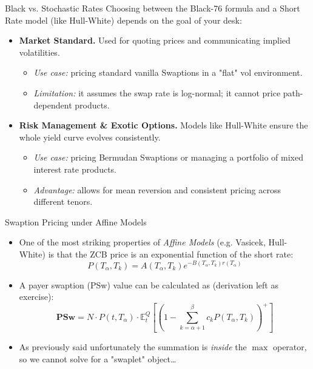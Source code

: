 \documentclass{beamer}
\begin{document}
\begin{frame}{Black vs. Stochastic Rates}
	Choosing between the Black-76 formula and a Short Rate model (like Hull-White) depends on the goal of your desk:
	\vfill
	\begin{itemize}
		\item \textbf{Market Standard.} Used for quoting prices and communicating implied volatilities.
		\begin{itemize}
			\item \emph{Use case:} pricing standard vanilla Swaptions in a "flat" vol environment.
			\item \emph{Limitation:} it assumes the swap rate is log-normal; it cannot price path-dependent products.
		\end{itemize}
		\vfill
		\item \textbf{Risk Management \& Exotic Options.} Models like Hull-White ensure the whole yield curve evolves consistently.
		\begin{itemize}
			\item \emph{Use case:} pricing Bermudan Swaptions or managing a portfolio of mixed interest rate products.
			\item \emph{Advantage:} allows for mean reversion and consistent pricing across different tenors.
		\end{itemize}
	\end{itemize}
\end{frame}

\begin{frame}{Swaption Pricing under Affine Models}
	\begin{itemize}
		\item One of the most striking properties of \emph{Affine Models} (e.g. Vasicek, Hull-White) is that the ZCB price is an exponential function of the short rate:
		\begin{equation*}
			P(T_\alpha, T_k) = A(T_\alpha, T_k) e^{-B(T_\alpha, T_k) r(T_\alpha)}
		\end{equation*}
		\item A payer swaption (PSw) value can be calculated as (derivation left as exercise):
		\begin{equation}
			\textbf{PSw} = N\cdot P(t, T_\alpha)\cdot \mathbb{E}^{Q}_t \left[ \left( 1 - \sum_{k=\alpha+1}^\beta c_k P(T_\alpha, T_k) \right)^+ \right]
			\label{eq:swaption_payoff_std_v2}
		\end{equation}
		\item As previously said unfortunately the summation is \emph{inside} the $\max$ operator, so we cannot solve for a "swaplet" object\ldots
	\end{itemize}
\end{frame}
\end{document}
